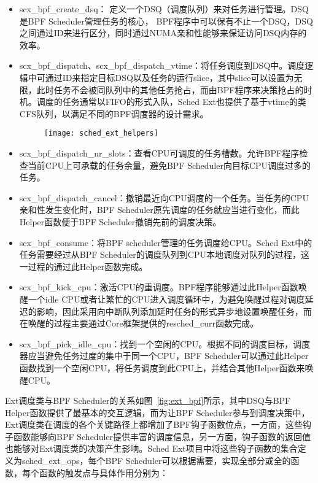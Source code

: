 \begin{itemize}
    \item scx\_bpf\_create\_dsq： 定义一个DSQ（调度队列）来对任务进行管理。DSQ是BPF Scheduler管理任务的核心， BPF程序中可以保有不止一个DSQ，DSQ之间通过ID来进行区分，同时通过NUMA亲和性能够来保证访问DSQ内存的效率。
    \item scx\_bpf\_dispatch、scx\_bpf\_dispatch\_vtime：将任务调度到DSQ中。调度逻辑中可通过ID来指定目标DSQ以及任务的运行slice，其中slice可以设置为无限，此时任务不会被同队列中的其他任务抢占，而由BPF程序来决策抢占的时机。调度的任务通常以FIFO的形式入队，Sched Ext也提供了基于vtime的类CFS队列，以满足不同的BPF调度器的设计需求。

    \begin{figure}[!htbp]
        \centering
        \texttt{[image: sched\_ext\_helpers]}
        \label{fig:sched_ext_helpers}
    \end{figure}

    
    \item scx\_bpf\_dispatch\_nr\_slots：查看CPU可调度的任务槽数。允许BPF程序检查当前CPU上可承载的任务余量，避免BPF Scheduler向目标CPU调度过多的任务。
    \item scx\_bpf\_dispatch\_cancel：撤销最近向CPU调度的一个任务。当任务的CPU亲和性发生变化时，BPF Scheduler原先调度的任务就应当进行变化，而此Helper函数便于BPF Scheduler撤销先前的调度决策。
    \item scx\_bpf\_consume：将BPF scheduler管理的任务调度给CPU。Sched Ext中的任务需要经过从BPF Scheduler的调度队列到CPU本地调度对队列的过程，这一过程的通过此Helper函数完成。
    \item scx\_bpf\_kick\_cpu：激活CPU的重调度。BPF程序能够通过此Helper函数唤醒一个idle CPU或者让繁忙的CPU进入调度循环中，为避免唤醒过程对调度延迟的影响，因此采用向中断队列添加延时任务的形式异步地设置唤醒任务，而在唤醒的过程主要通过Core框架提供的resched\_curr函数完成。
    \item scx\_bpf\_pick\_idle\_cpu：找到一个空闲的CPU。根据不同的调度目标，调度器应当避免任务过度的集中于同一个CPU，BPF Scheduler可以通过此Helper函数找到一个空闲CPU，将任务调度到此CPU上，并结合其他Helper函数来唤醒CPU。
\end{itemize}

Ext调度类与BPF Scheduler的关系如图~\ref{fig:ext_bpf}所示，其中DSQ与BPF Helper函数提供了最基本的交互逻辑，而为让BPF Scheduler参与到调度决策中，Ext调度类在调度的各个关键路径上都增加了BPF钩子函数位点，一方面，这些钩子函数能够向BPF Scheduler提供丰富的调度信息，另一方面，钩子函数的返回值也能够对Ext调度类的决策产生影响。Sched Ext项目中将这些钩子函数的集合定义为sched\_ext\_ops，每个BPF Scheduler可以根据需要，实现全部分或全的函数，每个函数的触发点与具体作用分别为：

